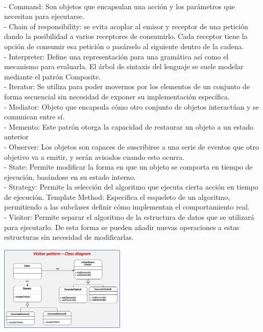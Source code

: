 \documentclass[twoside,twocolumn]{article}
\begin{document}
\begin{itemize}
\\- Command: Son objetos que encapsulan una acción y los parámetros que necesitan para ejecutarse.
\\- Chain of responsibility: se evita acoplar al emisor y receptor de una petición dando la posibilidad a varios receptores de consumirlo. Cada receptor tiene la opción de consumir esa petición o pasárselo al siguiente dentro de la cadena.
\\- Interpreter: Define una representación para una gramática así como el mecanismo para evaluarla. El árbol de sintaxis del lenguaje se suele modelar mediante el patrón Composite.
\\- Iterator: Se utiliza para poder movernos por los elementos de un conjunto de forma secuencial sin necesidad de exponer su implementación específica.
\\- Mediator: Objeto que encapsula cómo otro conjunto de objetos interactúan y se comunican entre sí.
\\- Memento: Este patrón otorga la capacidad de restaurar un objeto a un estado anterior
\\- Observer: Los objetos son capaces de suscribirse a una serie de eventos que otro objetivo va a emitir, y serán avisados cuando esto ocurra.
\\- State: Permite modificar la forma en que un objeto se comporta en tiempo de ejecución, basándose en su estado interno.
\\- Strategy: Permite la selección del algoritmo que ejecuta cierta acción en tiempo de ejecución.
Template Method: Especifica el esqueleto de un algoritmo, permitiendo a las subclases definir cómo implementan el comportamiento real.
\\- Visitor: Permite separar el algoritmo de la estructura de datos que se utilizará para ejecutarlo. De esta forma se pueden añadir nuevas operaciones a estas estructuras sin necesidad de modificarlas.
	\begin{center}
	\includegraphics[width=6cm]{./imagenes/comp.png} 
	\end{center}
\end{itemize} 
\end{document}

